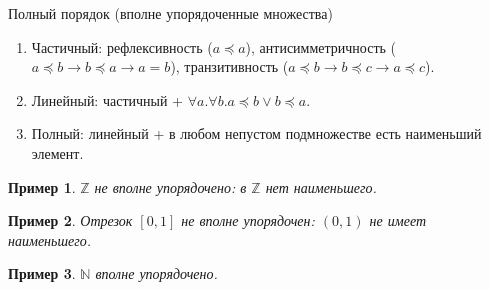 \documentclass[aspectratio=169]{beamer}
\newtheorem{exm}{Пример}[section]
\begin{document}
\begin{frame}{Полный порядок (вполне упорядоченные множества)}
\begin{enumerate}
\item Частичный: рефлексивность ($a \preceq a$), антисимметричность ($a \preceq b \rightarrow b \preceq a\rightarrow a=b$),
транзитивность ($a \preceq b \rightarrow b \preceq c \rightarrow a \preceq c$).\pause
\item Линейный: частичный + $\forall a.\forall b.a \preceq b \vee b \preceq a$.\pause
\item Полный: линейный + в любом непустом подмножестве есть наименьший элемент.\pause
\end{enumerate}

\begin{exm}$\mathbb{Z}$ не вполне упорядочено: в $\mathbb{Z}$ нет наименьшего.\end{exm}\pause
\begin{exm}Отрезок $[0,1]$ не вполне упорядочен: $(0,1)$ не имеет наименьшего.\end{exm}\pause
\begin{exm}$\mathbb{N}$ вполне упорядочено.\end{exm}
\end{frame}
\end{document}

